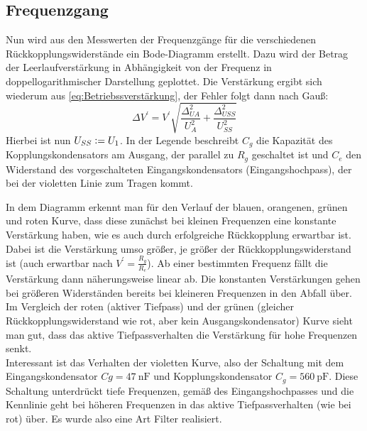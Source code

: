 \subsection{Frequenzgang}
\label{sec:Frequenzgang}
Nun wird aus den Messwerten der Frequenzgänge für die verschiedenen Rückkopplungswiderstände ein Bode-Diagramm erstellt. Dazu wird der Betrag der Leerlaufverstärkung in Abhängigkeit von der Frequenz in doppellogarithmischer Darstellung geplottet. Die Verstärkung ergibt sich wiederum aus \cref{eq:Betriebssverstärkung}, der Fehler folgt dann nach Gauß: 
\begin{equation}
    \Delta V^\prime=V^\prime\sqrt{\frac{\Delta_{U A}^{2}}{U_{A}^{2}} + \frac{\Delta_{U SS}^{2}}{U_{SS}^{2}}}
\end{equation}
Hierbei ist nun \(U_{SS}\vcentcolon= U_1\). In der Legende beschreibt \(C_g\) die Kapazität des Kopplungskondensators am Ausgang, der parallel zu \(R_g\) geschaltet ist und \(C_e\) den Widerstand des vorgeschalteten Eingangskondensators (Eingangshochpass), der bei der violetten Linie zum Tragen kommt.

In dem Diagramm erkennt man für den Verlauf der blauen, orangenen, grünen und roten Kurve, dass diese zunächst bei kleinen Frequenzen eine konstante Verstärkung haben, wie es auch durch erfolgreiche Rückkopplung erwartbar ist. Dabei ist die Verstärkung umso größer, je größer der Rückkopplungswiderstand ist (auch erwartbar nach \(V^\prime=\frac{R_g}{R_e}\)). Ab einer bestimmten Frequenz fällt die Verstärkung dann näherungsweise linear ab. Die konstanten Verstärkungen gehen bei größeren Widerständen bereits bei kleineren Frequenzen in den Abfall über.\\
Im Vergleich der roten (aktiver Tiefpass) und der grünen (gleicher Rückkopplungswiderstand wie rot, aber kein Ausgangskondensator) Kurve sieht man gut, dass das aktive Tiefpassverhalten die Verstärkung für hohe Frequenzen senkt. \\
Interessant ist das Verhalten der violetten Kurve, also der Schaltung mit dem Eingangskondensator \(Cg = \qty{47}{\nano\farad}\) und Kopplungskondensator \(C_g=\qty{560}{\pico\farad}\). Diese Schaltung unterdrückt tiefe Frequenzen, gemäß des Eingangshochpasses und die Kennlinie geht bei höheren Frequenzen in das aktive Tiefpassverhalten (wie bei rot) über. Es wurde also eine Art Filter realisiert.


